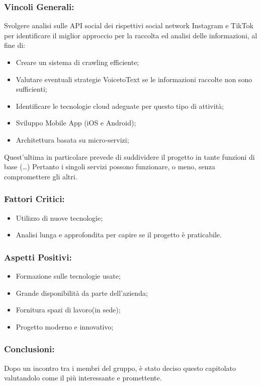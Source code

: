 \subsubsection{Vincoli Generali:}
Svolgere analisi sulle API social dei rispettivi social network Instagram e TikTok per identificare il miglior approccio per la raccolta ed analisi delle informazioni, al fine di:
\begin{itemize}
	\item Creare un sistema di crawling efficiente;
	\item Valutare eventuali strategie VoicetoText se le informazioni raccolte non sono sufficienti;
	\item Identificare le tecnologie cloud adeguate per questo tipo di attività;
	\item Sviluppo Mobile App (iOS e Android);
	\item Architettura basata su micro-servizi; 
\end{itemize}
Quest’ultima in particolare prevede di suddividere il progetto in tante funzioni di base (…) Pertanto i singoli servizi possono funzionare, o meno, senza compromettere gli altri.

\subsubsection{Fattori Critici:}
\begin{itemize}
	\item Utilizzo di nuove tecnologie;
	\item Analisi lunga e approfondita per capire se il progetto è praticabile.
\end{itemize}

\subsubsection{Aspetti Positivi:}
\begin{itemize}
	\item Formazione sulle tecnologie usate;
	\item Grande disponibilità da parte dell'azienda;
	\item Fornitura spazi di lavoro(in sede);
	\item Progetto moderno e innovativo; 
\end{itemize}

\subsubsection{Conclusioni:}
Dopo un incontro tra i membri del gruppo, è stato deciso questo capitolato valutandolo come il più interessante e promettente.